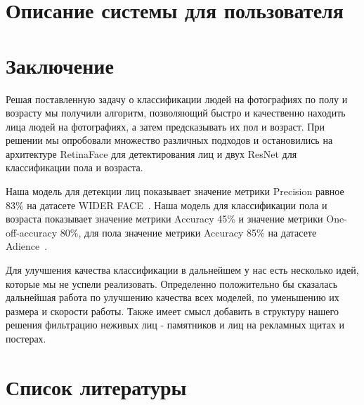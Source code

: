 \documentclass[a4paper,14pt]{extarticle}
\begin{document}
    \section{Описание системы для пользователя}\label{sec:описание-системы-для-пользователя}
    
    \newpage

    \section{Заключение}\label{sec:выводы}
    Решая поставленную задачу о классификации людей на фотографиях по полу и возрасту мы получили алгоритм,
    позволяющий быстро и качественно находить лица людей на фотографиях, а затем предсказывать их пол и возраст.
    При решении мы опробовали множество различных подходов и остановились на архитектуре RetinaFace для детектирования лиц
    и двух ResNet для классификации пола и возраста.
    \par Наша модель для детекции лиц показывает значение метрики Precision равное 83\% на датасете WIDER FACE~\cite{wider}.
    Наша модель для классификации пола и возраста показывает значение метрики Accuracy 45\% и
    значение метрики One-off-accuracy 80\%, для пола значение метрики Accuracy 85\% на датасете Adience~\cite{adience}.
    \par Для улучшения качества классификации в дальнейшем у нас есть несколько идей, которые мы не успели реализовать.
    Определенно положительно бы сказалась дальнейшая работа по улучшению качества всех моделей, по уменьшению их размера и скорости работы.
    Также имеет смысл добавить в структуру нашего решения фильтрацию неживых лиц - памятников и лиц на рекламных щитах и постерах.
    \newpage

    \section{Список литературы}\label{sec:список-литературы}
    
\end{document}
